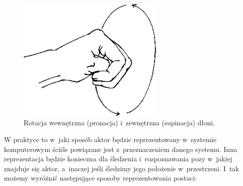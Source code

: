 \begin{figure}[!htp]
	\centering	
	\includegraphics[height=6cm]{images/Wrist_joint_rotation.png}
	\caption{Rotacja wewnętrzna (pronacja) i~zewnętrzna (supinacja) dłoni.}	
	\label{fig:literature:wristRotation}
\end{figure}

W praktyce to w~jaki sposób aktor będzie reprezentowany w~systemie komputerowym ściśle powiązane jest z~przeznaczeniem danego systemu. Inna reprezentacja będzie konieczna dla śledzenia i~rozpoznawania pozy w~jakiej znajduje się aktor, a~inaczej jeśli śledzimy jego położenie w~przestrzeni. I~tak możemy wyróżnić następujące sposoby reprezentowania postaci:
	
